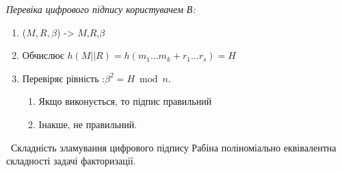 \textit{Перевіка цифрового підпису користувачем В:}

\begin{enumerate}
        \item   ($M,R,\beta$) -> $M$,$R$,$\beta$
        \item Обчислює  $h(M||R)=h(m_1…m_k+r_1…r_s)=H$
        \item Перевіряє рівність :$ \beta^2 = H \bmod n$.
        \begin{enumerate}
                \item Якщо виконується, то підпис правильний
                \item Інакше, не правильний.
        \end{enumerate} 
\end{enumerate}
\ Складність зламування цифрового підпису Рабіна поліноміально еквівалентна складності задачі факторизації.